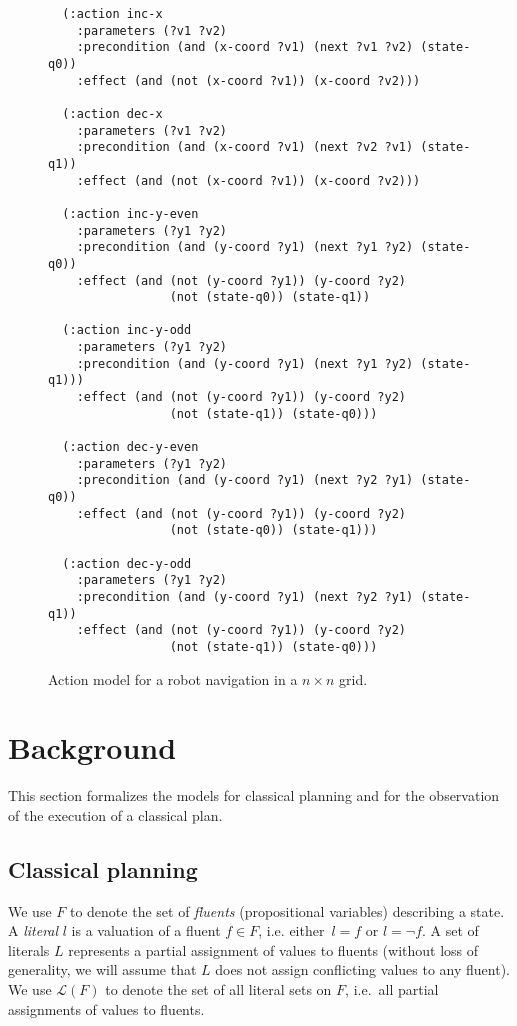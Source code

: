 \documentclass[letterpaper]{article} %
\begin{document}
\begin{figure}
  \begin{tiny}
  \begin{verbatim}
  (:action inc-x
    :parameters (?v1 ?v2)
    :precondition (and (x-coord ?v1) (next ?v1 ?v2) (state-q0))
    :effect (and (not (x-coord ?v1)) (x-coord ?v2)))

  (:action dec-x
    :parameters (?v1 ?v2)
    :precondition (and (x-coord ?v1) (next ?v2 ?v1) (state-q1))
    :effect (and (not (x-coord ?v1)) (x-coord ?v2)))

  (:action inc-y-even
    :parameters (?y1 ?y2)
    :precondition (and (y-coord ?y1) (next ?y1 ?y2) (state-q0))
    :effect (and (not (y-coord ?y1)) (y-coord ?y2)
                 (not (state-q0)) (state-q1))

  (:action inc-y-odd
    :parameters (?y1 ?y2)
    :precondition (and (y-coord ?y1) (next ?y1 ?y2) (state-q1)))
    :effect (and (not (y-coord ?y1)) (y-coord ?y2)
                 (not (state-q1)) (state-q0)))

  (:action dec-y-even
    :parameters (?y1 ?y2)
    :precondition (and (y-coord ?y1) (next ?y2 ?y1) (state-q0))
    :effect (and (not (y-coord ?y1)) (y-coord ?y2)
                 (not (state-q0)) (state-q1)))

  (:action dec-y-odd
    :parameters (?y1 ?y2)
    :precondition (and (y-coord ?y1) (next ?y2 ?y1) (state-q1))
    :effect (and (not (y-coord ?y1)) (y-coord ?y2)
                 (not (state-q1)) (state-q0)))
  \end{verbatim}           
  \end{tiny}  
 \caption{\small Action model for a robot navigation in a $n\times n$ grid.}
\label{fig:model-example}
\end{figure}



\section{Background}
\label{sec:background}
This section formalizes the models for classical planning and for the observation of the execution of a classical plan.

\subsection{Classical planning}
We use $F$ to denote the set of {\em fluents} (propositional variables) describing a state. A {\em literal} $l$ is a valuation of a fluent $f\in F$, i.e. either~$l=f$ or $l=\neg f$. A set of literals $L$ represents a partial assignment of values to fluents (without loss of generality, we will assume that $L$ does not assign conflicting values to any fluent). We use $\mathcal{L}(F)$ to denote the set of all literal sets on $F$, i.e.~all partial assignments of values to fluents.
\end{document}
